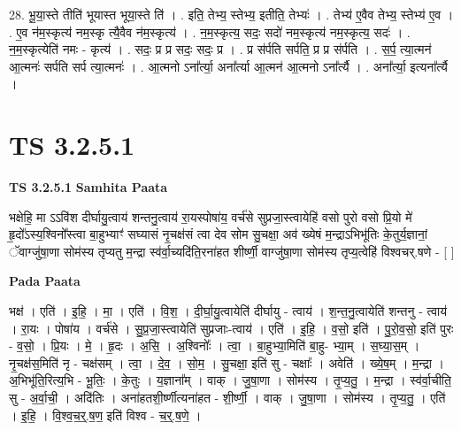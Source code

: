 \documentclass[17pt]{extarticle}
\begin{document}
28. भू॒या॒स्ते तीति॑ भूयास्त भूया॒स्ते ति॑ । . इति॒ तेभ्य॒ स्तेभ्य॒ इतीति॒ तेभ्यः॑ । . तेभ्य॑ ए॒वैव तेभ्य॒ स्तेभ्य॑ ए॒व । . ए॒व न॑म॒स्कृत्य॑ नम॒स्कृ त्यै॒वैव न॑म॒स्कृत्य॑ । . न॒म॒स्कृत्य॒ सदः॒ सदो॑ नम॒स्कृत्य॑ नम॒स्कृत्य॒ सदः॑ । . न॒म॒स्कृत्येति॑ नमः - कृत्य॑ । . सदः॒ प्र प्र सदः॒ सदः॒ प्र । . प्र स॑र्पति सर्पति॒ प्र प्र स॑र्पति । . स॒र्प॒ त्या॒त्मन॑ आ॒त्मनः॑ सर्पति सर्प त्या॒त्मनः॑ । . आ॒त्मनो ऽना᳚र्त्या॒ अना᳚र्त्या आ॒त्मन॑ आ॒त्मनो ऽना᳚र्त्यै । . अना᳚र्त्या॒ इत्यना᳚र्त्यै । \newline


\section{ TS 3.2.5.1 }

\textbf{TS 3.2.5.1 } \newline
\textbf{Samhita Paata} \newline

भक्षेहि॒ मा ऽऽवि॑श दीर्घायु॒त्वाय॑ शन्तनु॒त्वाय॑ रा॒यस्पोषा॑य॒ वर्च॑से सुप्रजा॒स्त्वायेहि॑ वसो पुरो वसो प्रि॒यो मे॑ हृ॒दो᳚ऽस्य॒श्विनो᳚स्त्वा बा॒हुभ्याꣳ॑ सघ्यासं नृ॒चक्ष॑सं त्वा देव सोम सु॒चक्षा॒ अव॑ ख्येषं म॒न्द्राऽभिभू॑तिः के॒तुर्य॒ज्ञानां॒ ॅवाग्जु॑षा॒णा सोम॑स्य तृप्यतु म॒न्द्रा स्व॑र्वा॒च्यदि॑ति॒रना॑हत शीर्ष्णी॒ वाग्जु॑षा॒णा सोम॑स्य तृप्य॒त्वेहि॑ विश्वचर्.षणे - [  ] \newline

\textbf{Pada Paata} \newline

भक्ष॑ । एति॑ । इ॒हि॒ । मा॒ । एति॑ । वि॒श॒ । दी॒र्घा॒यु॒त्वायेति॑ दीर्घायु - त्वाय॑ । श॒न्त॒नु॒त्वायेति॑ शन्तनु - त्वाय॑ । रा॒यः । पोषा॑य । वर्च॑से । सु॒प्र॒जा॒स्त्वायेति॑ सुप्रजाः-त्वाय॑ । एति॑ । इ॒हि॒ । व॒सो॒ इति॑ । पु॒रो॒व॒सो॒ इति॑ पुरः - व॒सो॒ । प्रि॒यः । मे॒ । हृ॒दः । अ॒सि॒ । अ॒श्विनोः᳚ । त्वा॒ । बा॒हुभ्या॒मिति॑ बा॒हु- भ्या॒म् । स॒घ्या॒स॒म् । नृ॒चक्ष॑स॒मिति॑ नृ - चक्ष॑सम् । त्वा॒ । दे॒व॒ । सो॒म॒ । सु॒चक्षा॒ इति॑ सु - चक्षाः᳚ । अवेति॑ । ख्ये॒ष॒म् । म॒न्द्रा । अ॒भिभू॑ति॒रित्य॒भि - भू॒तिः॒ । के॒तुः । य॒ज्ञाना᳚म् । वाक् । जु॒षा॒णा । सोम॑स्य । तृ॒प्य॒तु॒ । म॒न्द्रा । स्व॑र्वा॒चीति॒ सु - अ॒र्वा॒ची॒ । अदि॑तिः । अना॑हतशी॒र्ष्णीत्यना॑हत - शी॒र्ष्णी॒ । वाक् । जु॒षा॒णा । सोम॑स्य । तृ॒प्य॒तु॒ । एति॑ । इ॒हि॒ । वि॒श्व॒च॒र्॒.ष॒ण॒ इति॑ विश्व - च॒र्॒.ष॒णे॒ ।  \newline
\end{document}
